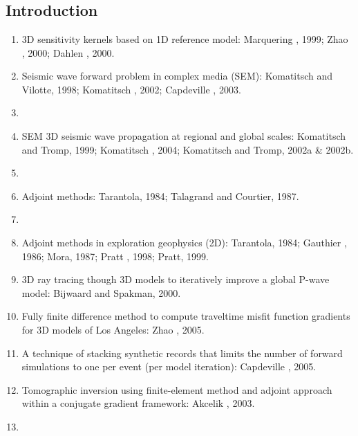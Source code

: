 \renewcommand{\pmk}{Tape\_2007\_GJI\_Adjoint tomography 2D}
\renewcommand{\prf}{FWI/\pmk.pdf}
\renewcommand{\pti}{Finite-frequency tomography using adjoint methods -- Methodology and examples using membrane surface waves}
\renewcommand{\pay}{Carl Tape, Qinya Liu and Jeroen Tromp, 2007}
\renewcommand{\pjo}{Geophys. J. Int.}
\renewcommand{\pda}{2017/1/30 Mon.}
\section{\pinfo}
\subsection{Introduction}
\begin{enumerate}[\hspace{10mm*}]
  \item 3D \Frechet sensitivity kernels based on 1D reference model: Marquering \etal, 1999; Zhao \etal, 2000; Dahlen \etal, 2000.
  \item Seismic wave forward problem in complex media (SEM): Komatitsch and Vilotte, 1998; Komatitsch \etal, 2002; Capdeville \etal, 2003.
  \item \sline
  \item SEM 3D seismic wave propagation at regional and global scales: Komatitsch and Tromp, 1999; Komatitsch \etal, 2004; Komatitsch and Tromp, 2002a \& 2002b.
  \item \sline
  \item Adjoint methods: Tarantola, 1984; Talagrand and Courtier, 1987.
  \item \sline
  \item Adjoint methods in exploration geophysics (2D): Tarantola, 1984; Gauthier \etal, 1986; Mora, 1987; Pratt \etal, 1998; Pratt, 1999.
  \item 3D ray tracing though 3D models to iteratively improve a global P-wave model: Bijwaard and Spakman, 2000.
  \item Fully finite difference method to compute traveltime misfit function gradients for 3D models of Los Angeles: Zhao \etal, 2005.
  \item A technique of stacking synthetic records that limits the number of forward simulations to one per event (per model iteration): Capdeville \etal, 2005.
  \item Tomographic inversion using finite-element method and adjoint approach within a conjugate gradient framework: Akcelik \etal, 2003.
  \item \sline

\end{enumerate}
